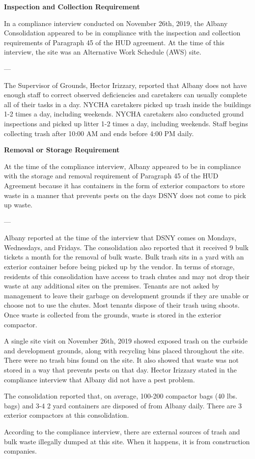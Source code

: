  

\textbf{Inspection and Collection Requirement} 

 

In a compliance interview conducted on November 26th, 2019, the Albany Consolidation appeared to be in compliance with the inspection and collection requirements of Paragraph 45 of the HUD agreement. At the time of this interview, the site was an Alternative Work Schedule (AWS) site. 

--- 

The Supervisor of Grounds, Hector Irizzary, reported that Albany does not have enough staff to correct observed deficiencies and caretakers can usually complete all of their tasks in a day. NYCHA caretakers picked up trash inside the buildings 1-2 times a day, including weekends. NYCHA caretakers also conducted ground inspections and picked up litter 1-2 times a day, including weekends. Staff begins collecting trash after 10:00 AM and ends before 4:00 PM daily. 

 

\textbf{Removal or Storage Requirement} 

At the time of the compliance interview, Albany appeared to be in compliance with the storage and removal requirement of Paragraph 45 of the HUD Agreement because it has containers in the form of exterior compactors to store waste in a manner that prevents pests on the days DSNY does not come to pick up waste.

 

--- 

Albany reported at the time of the interview that DSNY comes on Mondays, Wednesdays, and Fridays. The consolidation also reported that it received 9 bulk tickets a month for the removal of bulk waste. Bulk trash sits in a yard with an exterior container before being picked up by the vendor. In terms of storage, residents of this consolidation have access to trash chutes and may not drop their waste at any additional sites on the premises. Tenants are not asked by management to leave their garbage on development grounds if they are unable or choose not to use the chutes. Most tenants dispose of their trash using shoots. Once waste is collected from the grounds, waste is stored in the exterior compactor.  

 

A single site visit on November 26th, 2019 showed exposed trash on the curbside and development grounds, along with recycling bins placed throughout the site. There were no trash bins found on the site. It also showed that waste was not stored in a way that prevents pests on that day. Hector Irizzary stated in the compliance interview that Albany did not have a pest problem. 

 

The consolidation reported that, on average, 100-200 compactor bags (40 lbs. bags) and 3-4 2 yard containers are disposed of from Albany daily. There are 3 exterior compactors at this consolidation.

 

According to the compliance interview, there are external sources of trash and bulk waste illegally dumped at this site. When it happens, it is from construction companies.